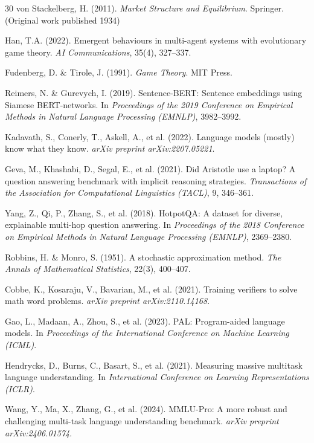 \documentclass[12pt,a4paper,UTF8,fontset=fandol]{ctexart}
\begin{document}
\begin{thebibliography}{30}
von Stackelberg, H. (2011). \textit{Market Structure and Equilibrium}. Springer. (Original work published 1934)

Han, T.A. (2022). Emergent behaviours in multi-agent systems with evolutionary game theory. \textit{AI Communications}, 35(4), 327--337.

Fudenberg, D. \& Tirole, J. (1991). \textit{Game Theory}. MIT Press.

Reimers, N. \& Gurevych, I. (2019). Sentence-BERT: Sentence embeddings using Siamese BERT-networks. In \textit{Proceedings of the 2019 Conference on Empirical Methods in Natural Language Processing (EMNLP)}, 3982--3992.

Kadavath, S., Conerly, T., Askell, A., et al. (2022). Language models (mostly) know what they know. \textit{arXiv preprint arXiv:2207.05221}.

Geva, M., Khashabi, D., Segal, E., et al. (2021). Did Aristotle use a laptop? A question answering benchmark with implicit reasoning strategies. \textit{Transactions of the Association for Computational Linguistics (TACL)}, 9, 346--361.

Yang, Z., Qi, P., Zhang, S., et al. (2018). HotpotQA: A dataset for diverse, explainable multi-hop question answering. In \textit{Proceedings of the 2018 Conference on Empirical Methods in Natural Language Processing (EMNLP)}, 2369--2380.

Robbins, H. \& Monro, S. (1951). A stochastic approximation method. \textit{The Annals of Mathematical Statistics}, 22(3), 400--407.

Cobbe, K., Kosaraju, V., Bavarian, M., et al. (2021). Training verifiers to solve math word problems. \textit{arXiv preprint arXiv:2110.14168}.

Gao, L., Madaan, A., Zhou, S., et al. (2023). PAL: Program-aided language models. In \textit{Proceedings of the International Conference on Machine Learning (ICML)}.

Hendrycks, D., Burns, C., Basart, S., et al. (2021). Measuring massive multitask language understanding. In \textit{International Conference on Learning Representations (ICLR)}.

Wang, Y., Ma, X., Zhang, G., et al. (2024). MMLU-Pro: A more robust and challenging multi-task language understanding benchmark. \textit{arXiv preprint arXiv:2406.01574}.


\end{thebibliography}
\end{document}
